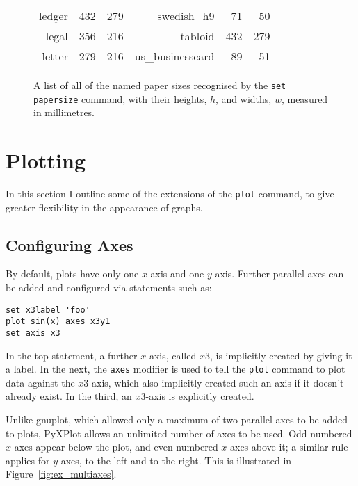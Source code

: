 \documentclass[a4paper,onecolumn,11pt]{book}
\begin{document}
\begin{figure}
\begin{tabular}{|rrr|rrr|}
                    ledger &    432 &    279 &       swedish\_h9 &     71 &     50 \\
                     legal &    356 &    216 &          tabloid &    432 &    279 \\
                    letter &    279 &    216 &  us\_businesscard &     89 &     51 \\
\hline
\end{tabular}
\caption{A list of all of the named paper sizes recognised by the \texttt{set papersize} command, with their heights, $h$, and widths, $w$, measured in millimetres.}
\label{paper_sizes}
\end{figure}

\section{Plotting}

In this section I outline some of the extensions of the \texttt{plot} command,
to give greater flexibility in the appearance of graphs.

\subsection{Configuring Axes}
\label{axis_extensions}\label{ranges_multiaxes}\label{multiple_axes}

By default, plots have only one $x$-axis and one $y$-axis. Further parallel
axes can be added and configured via statements such as:

\begin{verbatim}
set x3label 'foo'
plot sin(x) axes x3y1
set axis x3
\end{verbatim}

\noindent In the top statement, a further $x$ axis, called $x3$, is implicitly
created by giving it a label. In the next, the \texttt{axes} modifier is used
to tell the \texttt{plot} command to plot data against the $x3$-axis, which
also implicitly created such an axis if it doesn't already exist. In the third,
an $x3$-axis is explicitly created.

Unlike gnuplot, which allowed only a maximum of two parallel axes to be added
to plots, PyXPlot allows an unlimited number of axes to be used. Odd-numbered
$x$-axes appear below the plot, and even numbered $x$-axes above it; a similar
rule applies for $y$-axes, to the left and to the right. This is illustrated in
Figure~\ref{fig:ex_multiaxes}.
\end{document}
